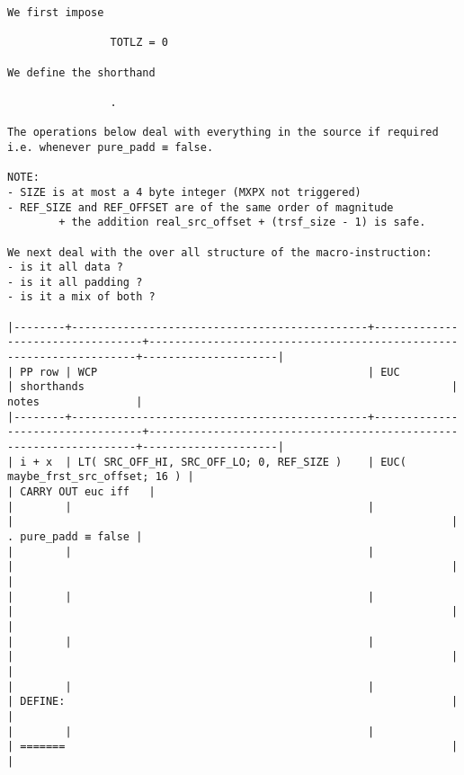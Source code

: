 \documentclass[varwidth=\maxdimen,margin=0.5cm,multi={verbatim}]{standalone}
\begin{document}
\begin{verbatim}
We first impose

                TOTLZ = 0

We define the shorthand

                .

The operations below deal with everything in the source if required i.e. whenever pure_padd ≡ false.

NOTE:
- SIZE is at most a 4 byte integer (MXPX not triggered)
- REF_SIZE and REF_OFFSET are of the same order of magnitude
        + the addition real_src_offset + (trsf_size - 1) is safe.   

We next deal with the over all structure of the macro-instruction:
- is it all data ?
- is it all padding ?
- is it a mix of both ?

|--------+----------------------------------------------+----------------------------------+--------------------------------------------------------------------+---------------------|
| PP row | WCP                                          | EUC                              | shorthands                                                         | notes               |
|--------+----------------------------------------------+----------------------------------+--------------------------------------------------------------------+---------------------|
| i + x  | LT( SRC_OFF_HI, SRC_OFF_LO; 0, REF_SIZE )    | EUC( maybe_frst_src_offset; 16 ) |                                                                    | CARRY OUT euc iff   |
|        |                                              |                                  |                                                                    | . pure_padd ≡ false |
|        |                                              |                                  |                                                                    |                     |
|        |                                              |                                  |                                                                    |                     |
|        |                                              |                                  |                                                                    |                     |
|        |                                              |                                  | DEFINE:                                                            |                     |
|        |                                              |                                  | =======                                                            |                     |

\end{verbatim}
\end{document}
